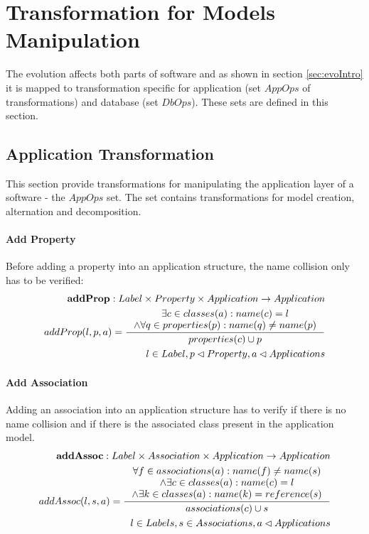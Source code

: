 \documentclass[11pt]{article}
\begin{document}
\section{Transformation for Models Manipulation}
The evolution affects both parts of software and as shown in section \ref{sec:evoIntro} it is mapped to transformation specific for application (set $AppOps$ of transformations) and database (set $DbOps$). These sets are defined in this section.
\subsection{Application Transformation}
This section provide transformations for manipulating the application layer of a software - the $AppOps$ set. The set contains transformations for model creation, alternation and decomposition.

\paragraph{Add Property}Before adding a property into an application structure, the name collision only has to be verified:
\begin{align*}
 	\mathbf{addProp} : Label \times Property \times Application \rightarrow Application \\
	addProp(l, p, a) = \inference{\exists c \in classes(a) : name(c) = l \\ \wedge \forall q \in  properties(p) : name(q) \neq name(p)}{properties(c) \cup p } \\
	l \in Label, p \lhd Property, a \lhd Applications
\end{align*}

\paragraph{Add Association} Adding an association into an application structure has to verify if there is no name collision and if there is the associated class present in the application model.
\begin{align*}
	\mathbf{addAssoc} : Label \times Association \times Application \rightarrow Application \\
	addAssoc(l, s, a) = \inference{\forall f \in associations(a) : name(f) \neq name(s) \\ \wedge \exists c \in classes(a) : name(c) = l \\ \wedge \exists k \in classes(a) : name(k) = reference(s) }{associations(c) \cup s}\\
	l \in Labels, s \in Associations, a \lhd Applications
\end{align*}
\end{document}
